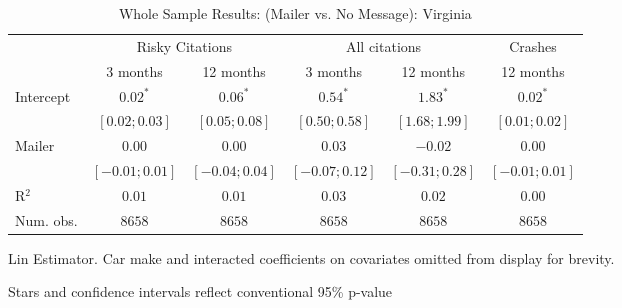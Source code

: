 
\begin{table}
\caption{Whole Sample Results: (Mailer vs. No Message): Virginia}
\begin{center}
\begin{threeparttable}
\begin{tabular}{l c c c c c}
\hline
 & \multicolumn{2}{c}{Risky Citations} & \multicolumn{2}{c}{All citations} & \multicolumn{1}{c}{Crashes} \\
\cline{2-3} \cline{4-5} \cline{6-6}
 & 3 months & 12 months & 3 months & 12 months & 12 months \\
\hline
Intercept & $0.02^{*}$       & $0.06^{*}$       & $0.54^{*}$       & $1.83^{*}$       & $0.02^{*}$       \\
          & $ [ 0.02; 0.03]$ & $ [ 0.05; 0.08]$ & $ [ 0.50; 0.58]$ & $ [ 1.68; 1.99]$ & $ [ 0.01; 0.02]$ \\
Mailer    & $0.00$           & $0.00$           & $0.03$           & $-0.02$          & $0.00$           \\
          & $ [-0.01; 0.01]$ & $ [-0.04; 0.04]$ & $ [-0.07; 0.12]$ & $ [-0.31; 0.28]$ & $ [-0.01; 0.01]$ \\
\hline
R$^2$     & $0.01$           & $0.01$           & $0.03$           & $0.02$           & $0.00$           \\
Num. obs. & $8658$           & $8658$           & $8658$           & $8658$           & $8658$           \\
\hline
\end{tabular}
\begin{tablenotes}[flushleft]
\scriptsize{\item Lin Estimator. Car make and interacted coefficients on covariates omitted from display for brevity.
                             \item Stars and confidence intervals reflect conventional 95\% p-value}
\end{tablenotes}
\end{threeparttable}
\label{table:coefficients}
\end{center}
\end{table}
